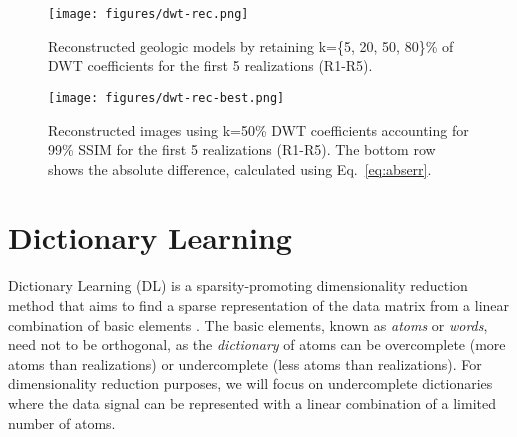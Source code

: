 \documentclass[a4paper,fleqn,12pt]{article}
\begin{document}
\begin{figure}[H]
    \centering
    \texttt{[image: figures/dwt-rec.png]}
    \caption{Reconstructed geologic models by retaining k=\{5, 20, 50, 80\}\% of DWT coefficients for the first 5 realizations (R1-R5).}
    \label{fig:dwt-rec}
\end{figure}

\begin{figure}[H]
    \centering
    \texttt{[image: figures/dwt-rec-best.png]}
    \caption{Reconstructed images using k=50\% DWT coefficients accounting for 99\% SSIM for the first 5 realizations (R1-R5). The bottom row shows the absolute difference, calculated using Eq.~\ref{eq:abserr}.}
    \label{fig:dwt-rec-best}
\end{figure}

\pagebreak
\section*{Dictionary Learning}
Dictionary Learning (DL) is a sparsity-promoting dimensionality reduction method that aims to find a sparse representation of the data matrix from a linear combination of basic elements \cite{tovsic2011dictionary, mairal2008supervised}. The basic elements, known as \emph{atoms} or \emph{words}, need not to be orthogonal, as the \emph{dictionary} of atoms can be overcomplete (more atoms than realizations) or undercomplete (less atoms than realizations). For dimensionality reduction purposes, we will focus on undercomplete dictionaries where the data signal can be represented with a linear combination of a limited number of atoms.
\end{document}
